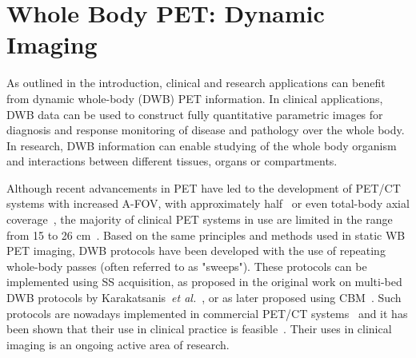 \section{Whole Body PET: Dynamic Imaging}
As outlined in the introduction, clinical and research applications can benefit from dynamic whole-body (DWB) PET information. In clinical applications, DWB data can be used to construct fully quantitative parametric images for diagnosis and response monitoring of disease and pathology over the whole body. In research, DWB information can enable studying of the whole body organism and interactions between different tissues, organs or compartments. 

Although recent advancements in PET have led to the development of PET/CT systems with increased A-FOV, with approximately half~\cite{Karp2020,Siegel2020} or even total-body axial coverage~\cite{Cherry2018}, the majority of clinical PET systems in use are limited in the range from 15 to 26 cm~\cite{Vandenberghe2020}. 
Based on the same principles and methods used in static WB PET imaging, DWB protocols have been developed with the use of repeating whole-body passes (often referred to as "sweeps"). 
These protocols can be implemented using SS acquisition, as proposed in the original work on multi-bed DWB protocols by Karakatsanis~\textit{et al.}~\cite{Karakatsanis2011,Karakatsanis2013}, or as later proposed using CBM~\cite{Karakatsanis2016a,Hu2020}. Such protocols are nowadays implemented in commercial PET/CT systems~\cite{Hu2020} and it has been shown that their use in clinical practice is feasible~\cite{Fahrni2019,Dias2020}.  Their uses in clinical imaging is an ongoing active area of research.%

